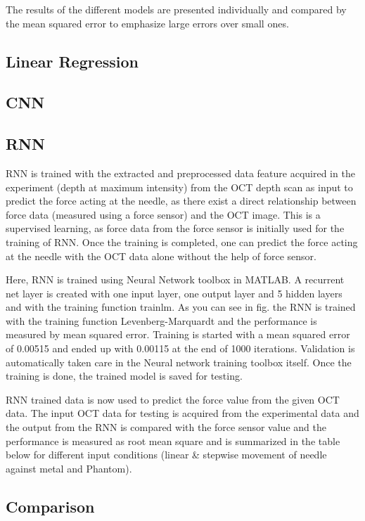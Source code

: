 
The results of the different models are presented individually and compared by the mean squared error to emphasize 
large errors over small ones.

\subsection{Linear Regression}
\subsection{CNN}
\subsection{RNN}
      RNN is trained with the extracted and preprocessed data feature acquired in the experiment (depth at maximum intensity) from the OCT depth scan as input to predict the force acting at the needle, as there exist a direct relationship between force data (measured using a force sensor) and the OCT image. This is a supervised learning, as force data from the force sensor is initially used for the training of RNN. Once the training is completed, one can predict the force acting at the needle with the OCT data alone without the help of force sensor.
      
      Here, RNN is trained using Neural Network toolbox in MATLAB. A recurrent net layer is created with one input layer, one output layer and 5 hidden layers and with the training function trainlm. As you can see in fig. the RNN is trained with the training function Levenberg-Marquardt and the performance is measured by mean squared error. Training is started with a mean squared error of 0.00515 and ended up with 0.00115 at the end of 1000 iterations. Validation is automatically taken care in the Neural network training toolbox itself. Once the training is done, the trained model is saved for testing. 
      
      RNN trained data is now used to predict the force value from the given OCT data. The input OCT data for testing is acquired from the experimental data and the output from the RNN is compared with the force sensor value and the performance is measured as root mean square and is summarized in the table below for different input conditions (linear & stepwise movement of needle against metal and Phantom). 
      
      
      
\subsection{Comparison}

